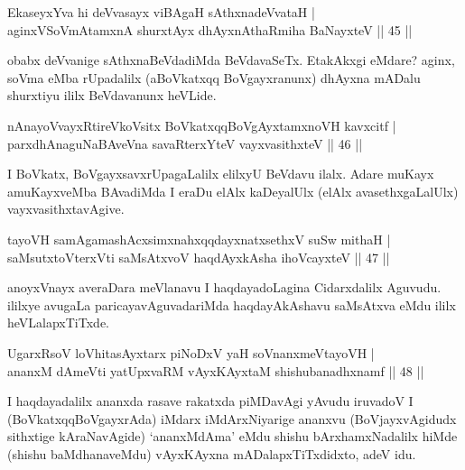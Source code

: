 
\begin{shl}
EkaseyxYva hi deVvasayx viBAgaH sAthxnadeVvataH |\\
aginxVSoVmAtamxnA shurxtAyx dhAyxnAthaRmiha BaNayxteV \hfill || 45 || 
\end{shl}

\begin{artha}
obabx deVvanige sAthxnaBeVdadiMda BeVdavaSeTx. EtakAkxgi eMdare? aginx, soVma eMba rUpadalilx (aBoVkatxqq BoVgayxranunx) dhAyxna mADalu shurxtiyu ililx BeVdavanunx heVLide.
\end{artha}

\begin{shl}
nAnayoVvayxRtireVkoV\s sitx BoVkatxqqBoVgAyxtamxnoVH kavxcitf |\\
parxdhAnaguNaBAveVna savaRterxYteV vayxvasithxteV \hfill || 46 || 
\end{shl}

\begin{artha}
I BoVkatx, BoVgayxsavxrUpagaLalilx elilxyU BeVdavu ilalx. Adare muKayx amuKayxveMba BAvadiMda I eraDu elAlx kaDeyalUlx (elAlx avasethxgaLalUlx) vayxvasithxtavAgive.
\end{artha}


\begin{shl}
tayoVH samAgamashAcxsimxnahxqqdayxnatxsethxV suSw mithaH |\\
saMsutxtoV\s terxVti saMsAtxvoV haqdAyxkAsha ihoVcayxteV \hfill || 47 || 
\end{shl}

\begin{artha}
anoyxVnayx averaDara meVlanavu I haqdayadoLagina Cidarxdalilx Aguvudu. ililxye avugaLa paricayavAguvadariMda haqdayAkAshavu saMsAtxva eMdu ililx heVLalapxTiTxde.
\end{artha}


\begin{shl}
UgarxRsoV loVhitasAyxtarx piNoDxV yaH soV\s nanxmeVtayoVH |\\
ananxM dAmeVti yatUpxvaRM vAyxKAyxtaM shishubanadhxnamf \hfill || 48 || 
\end{shl}

\begin{artha}
I haqdayadalilx ananxda rasave rakatxda piMDavAgi yAvudu iruvadoV I (BoVkatxqqBoVgayxrAda) iMdarx iMdArxNiyarige ananxvu (BoVjayxvAgidudx sithxtige kAraNavAgide) `ananxMdAma' eMdu shishu bArxhamxNadalilx hiMde (shishu baMdhanaveMdu) vAyxKAyxna mADalapxTiTxdidxto, adeV idu.
\end{artha}

